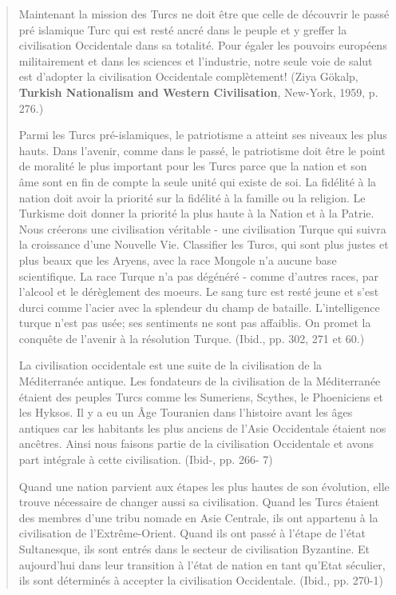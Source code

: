 \begin{quote}
Maintenant la mission des Turcs ne doit être que celle de découvrir le
passé pré islamique Turc qui est resté ancré dans le peuple et y greffer
la civilisation Occidentale dans sa totalité. Pour égaler les pouvoirs
européens militairement et dans les sciences et l'industrie, notre seule
voie de salut est d'adopter la civilisation Occidentale complètement!
(Ziya Gökalp, \textbf{Turkish Nationalism and Western Civilisation},
New-York, 1959, p. 276.)

Parmi les Turcs pré-islamiques, le patriotisme a atteint ses niveaux les
plus hauts. Dans l'avenir, comme dans le passé, le patriotisme doit être
le point de moralité le plus important pour les Turcs parce que la
nation et son âme sont en fin de compte la seule unité qui existe de
soi. La fidélité à la nation doit avoir la priorité sur la fidélité à la
famille ou la religion. Le Turkisme doit donner la priorité la plus
haute à la Nation et à la Patrie. Nous créerons une civilisation
véritable - une civilisation Turque qui suivra la croissance d'une
Nouvelle Vie. Classifier les Turcs, qui sont plus justes et plus beaux
que les Aryens, avec la race Mongole n'a aucune base scientifique. La
race Turque n'a pas dégénéré - comme d'autres races, par l'alcool et le
dérèglement des moeurs. Le sang turc est resté jeune et s'est durci
comme l'acier avec la splendeur du champ de bataille. L'intelligence
turque n'est pas usée; ses sentiments ne sont pas affaiblis. On promet
la conquête de l'avenir à la résolution Turque. (Ibid., pp. 302, 271 et
60.)

La civilisation occidentale est une suite de la civilisation de la
Méditerranée antique. Les fondateurs de la civilisation de la
Méditerranée étaient des peuples Turcs comme les Sumeriens, Scythes, le
Phoeniciens et les Hyksos. Il y a eu un Âge Touranien dans l'histoire
avant les âges antiques car les habitants les plus anciens de l'Asie
Occidentale étaient nos ancêtres. Ainsi nous faisons partie de la
civilisation Occidentale et avons part intégrale à cette civilisation.
(Ibid-, pp. 266- 7)

Quand une nation parvient aux étapes les plus hautes de son évolution,
elle trouve nécessaire de changer aussi sa civilisation. Quand les Turcs
étaient des membres d'une tribu nomade en Asie Centrale, ils ont
appartenu à la civilisation de l'Extrême-Orient. Quand ils ont passé à
l'étape de l'état Sultanesque, ils sont entrés dans le secteur de
civilisation Byzantine. Et aujourd'hui dans leur transition à l'état de
nation en tant qu'Etat séculier, ils sont déterminés à accepter la
civilisation Occidentale. (Ibid., pp. 270-1)


\end{quote}

